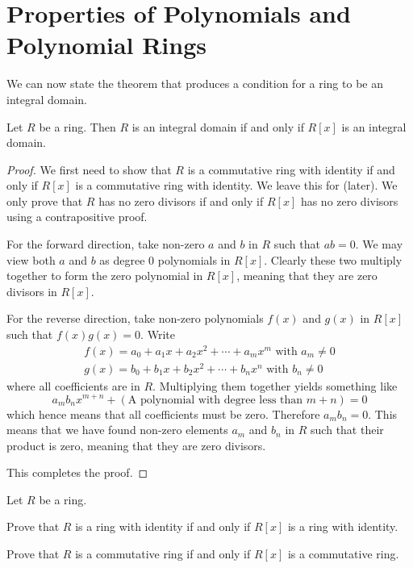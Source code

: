 \section{Properties of Polynomials and Polynomial Rings}
We can now state the theorem that produces a condition for a ring to be an integral domain.
\begin{theorem}\label{thrm-integral-domain-iff-polynomial-ring-is-also}
    Let $R$ be a ring. Then $R$ is an integral domain if and only if $R[x]$ is an integral domain.
\end{theorem}
\begin{proof}
    We first need to show that $R$ is a commutative ring with identity if and only if $R[x]$ is a commutative ring with identity. We leave this for  (later). We only prove that $R$ has no zero divisors if and only if $R[x]$ has no zero divisors using a contrapositive proof.

    For the forward direction, take non-zero $a$ and $b$ in $R$ such that $ab = 0$. We may view both $a$ and $b$ as degree 0 polynomials in $R[x]$. Clearly these two multiply together to form the zero polynomial in $R[x]$, meaning that they are zero divisors in $R[x]$.

    For the reverse direction, take non-zero polynomials $f(x)$ and $g(x)$ in $R[x]$ such that $f(x)g(x) = 0$. Write
    \begin{align*}
        f(x) = a_0+a_1x+a_2x^2+\cdots+a_mx^m \text{ with } a_m \neq 0\\
        g(x) = b_0+b_1x+b_2x^2+\cdots+b_nx^n \text{ with } b_n \neq 0
    \end{align*}
    where all coefficients are in $R$. Multiplying them together yields something like
    \[
        a_mb_nx^{m+n} + (\text{A polynomial with degree less than }m+n) = 0
    \]
    which hence means that all coefficients must be zero. Therefore $a_mb_n = 0$. This means that we have found non-zero elements $a_m$ and $b_n$ in $R$ such that their product is zero, meaning that they are zero divisors.

    This completes the proof.
\end{proof}
\begin{exercise}\label{exercise-commutative-ring-with-identity-iff-polynomial-ring-is-also}
    Let $R$ be a ring.
    \begin{partquestions}{\alph*}
        \item Prove that $R$ is a ring with identity if and only if $R[x]$ is a ring with identity.
        \item Prove that $R$ is a commutative ring if and only if $R[x]$ is a commutative ring.
    \end{partquestions}
\end{exercise}

